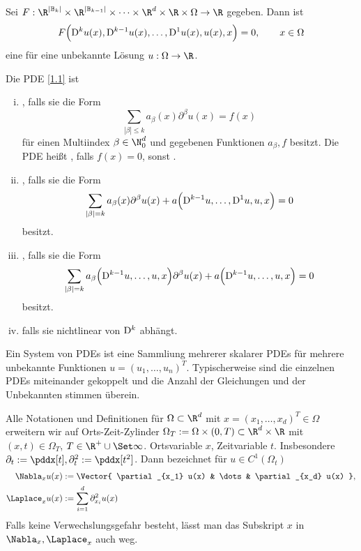 \begin{df} \label{1.8}
	Sei $F: \R^{|\mathbb{B}_k|} \times \R^{|\mathbb{B}_{k-1}|} \times \dotsb \times \R^d \times \R \times \Omega \to \R$ gegeben.
	Dann ist
	\begin{equation} \label{eq:1.1}
		F\Big(\mathrm{D}^k u(x), \mathrm{D}^{k-1} u(x), \dotsc, \mathrm{D}^1 u(x), u(x), x\Big) = 0,
		\qquad x \in \Omega
	\end{equation}
	eine  für eine unbekannte Lösung $u: \Omega \to \R$.
\end{df}

\begin{df} \label{1.9}
	Die PDE \eqref{1.1} ist
	\begin{enumerate}[i)]
		\item
			, falls sie die Form
			\[
				\sum_{|\beta| \le k} a_\beta(x) \partial^\beta u(x) = f(x)
			\]
			für einen Multiindex $\beta \in \N_0^d$ und gegebenen Funktionen $a_\beta, f$ besitzt.
			Die PDE heißt , falls $f(x) = 0$, sonst .
		\item
			, falls sie die Form
			\[
				\sum_{|\beta| = k} a_\beta(x) \partial^\beta u(x) + a \Big(\mathrm{D}^{k-1} u, \dotsc, \mathrm{D}^1 u, u, x\Big) = 0
			\]
			besitzt.
		\item
			, falls sie die Form
			\[
				\sum_{|\beta| = k} a_\beta\Big(\mathrm{D}^{k-1}u, \dotsc, u, x\Big) \partial^\beta u(x) + a\Big(\mathrm{D}^{k-1} u, \dotsc, u, x\Big) = 0
			\]
			besitzt.
		\item
			 falls sie nichtlinear von $\mathrm{D}^k$ abhängt.
	\end{enumerate}
	\begin{note}[Systeme]
		Ein System von PDEs ist eine Sammliung mehrerer skalarer PDEs für mehrere unbekannte Funktionen $u = (u_1, \dotsc, u_n)^T$.
		Typischerweise sind die einzelnen PDEs miteinander gekoppelt und die Anzahl der Gleichungen und der Unbekannten stimmen überein. 
	\end{note}
	\begin{note}
		Alle Notationen und Definitionen für $\Omega \subset \R^d$ mit $x = (x_1, \dotsc, x_d)^T \in \Omega$ erweitern wir auf Orts-Zeit-Zylinder $\Omega_T := \Omega \times (0, T) \subset \R^d \times \R$ mit $(x,t) \in \Omega_T$, $T \in \R^+ \cup \Set \infty$.
		Ortsvariable $x$, Zeitvariable $t$.
		Insbesondere $\partial_t := \pddx[t], \partial_t^2 := \pddx[t^2]$.
		Dann bezeichnet für $u \in C^1(\Omega_t)$
		\begin{align*}
			\Nabla_x u(x) &:= \Vector{ \partial_{x_1} u(x) & \dots & \partial_{x_d} u(x) }, \\
			\Laplace_x u(x) &:= \sum_{i=1}^d \partial_{x_i}^2 u(x)
		\end{align*}
		Falls keine Verwechslungsgefahr besteht, lässt man das Subskript $x$ in $\Nabla_x, \Laplace_x$ auch weg.
	\end{note}
\end{df}

